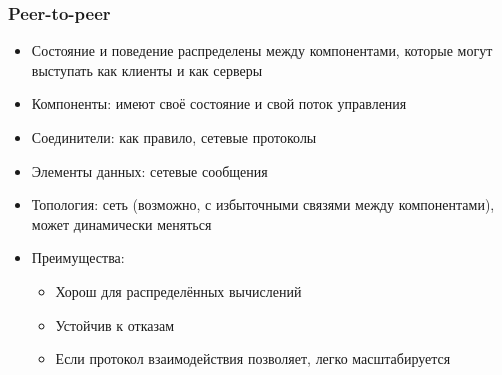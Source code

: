 \documentclass{../../slides-style}
\begin{document}
    \begin{frame}
        \frametitle{Peer-to-peer}
        \begin{itemize}
            \item Состояние и поведение распределены между компонентами, которые могут выступать как клиенты и как серверы
            \item Компоненты: имеют своё состояние и свой поток управления
            \item Соединители: как правило, сетевые протоколы
            \item Элементы данных: сетевые сообщения
            \item Топология: сеть (возможно, с избыточными связями между компонентами), может динамически меняться
            \item Преимущества:
            \begin{itemize}
                \item Хорош для распределённых вычислений
                \item Устойчив к отказам
                \item Если протокол взаимодействия позволяет, легко масштабируется
            \end{itemize}
        \end{itemize}
    \end{frame}
\end{document}
